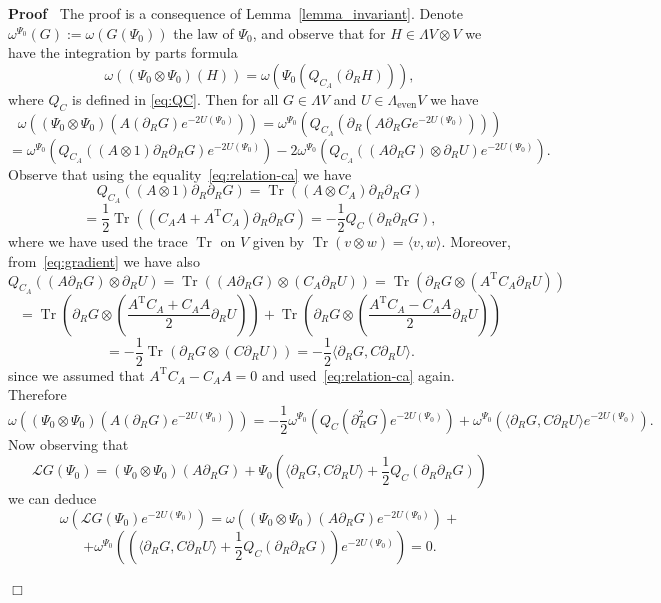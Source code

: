 \documentclass{article}
\newcommand{\Tau}{\mathrm{T}}
\newcommand{\assign}{:=}
\newcommand{\tmop}[1]{\ensuremath{\operatorname{#1}}}
\newenvironment{proof}{\noindent\textbf{Proof\ }}{\hspace*{\fill}$\Box$\medskip}
\begin{document}
\begin{proof}
  The proof is a consequence of Lemma~\ref{lemma_invariant}. Denote
  $\omega^{\Psi_0} (G) \assign \omega (G (\Psi_0))$ the law of $\Psi_0$, and
  observe that for $H \in \Lambda V \otimes V$ we have the integration by
  parts formula
  \[ \omega ((\Psi_0 \otimes \Psi_0) (H)) = \omega (\Psi_0 (Q_{C_A}
     (\partial_R H))), \]
  where $Q_C$ is defined in {\eqref{eq:QC}}. Then for all $G \in \Lambda V$
  and $U \in \Lambda_{\tmop{even}} V$ we have
  \[ \omega ((\Psi_0 \otimes \Psi_0) (A (\partial_R G) e^{- 2 U (\Psi_0)})) =
     \omega^{\Psi_0} (Q_{C_A} (\partial_R (A \partial_R G e^{- 2 U
     (\Psi_0)}))) \]
  \[ = \omega^{\Psi_0} (Q_{C_A} ((A \otimes 1) \partial_R \partial_R G) e^{- 2
     U (\Psi_0)}) - 2 \omega^{\Psi_0} (Q_{C_A} ((A \partial_R G) \otimes
     \partial_R U) e^{- 2 U (\Psi_0)}) . \]
  Observe that using the equality~{\eqref{eq:relation-ca}} we have
  \[ Q_{C_A} ((A \otimes 1) \partial_R \partial_R G) = \tmop{Tr} ((A \otimes
     C_A) \partial_R \partial_R G) \]
  \[ = \frac{1}{2} \tmop{Tr} ((C_A A + A^{\Tau} C_A) \partial_R \partial_R G)
     = - \frac{1}{2} Q_C (\partial_R \partial_R G), \]
  where we have used the trace $\tmop{Tr}$ on $V$ given by $\tmop{Tr} (v
  \otimes w) = \langle v, w \rangle$. Moreover, from~{\eqref{eq:gradient}} we
  have also
  \[ Q_{C_A} ((A \partial_R G) \otimes \partial_R U) = \tmop{Tr} ((A
     \partial_R G) \otimes (C_A \partial_R U)) = \tmop{Tr} (\partial_R G
     \otimes (A^{\Tau} C_A \partial_R U)) \]
  \[ = \tmop{Tr} \left( \partial_R G \otimes \left( \frac{A^{\Tau} C_A + C_A
     A}{2} \partial_R U \right) \right) + \tmop{Tr} \left( \partial_R G
     \otimes \left( \frac{A^{\Tau} C_A - C_A A}{2} \partial_R U \right)
     \right) \]
  \[ = - \frac{1}{2} \tmop{Tr} (\partial_R G \otimes (C \partial_R U)) = -
     \frac{1}{2} \langle \partial_R G, C \partial_R U \rangle . \]
  since we assumed that $A^{\Tau} C_A - C_A A = 0$ and
  used~{\eqref{eq:relation-ca}} again. Therefore
  \[ \omega ((\Psi_0 \otimes \Psi_0) (A (\partial_R G) e^{- 2 U (\Psi_0)})) =
     - \frac{1}{2} \omega^{\Psi_0} (Q_C (\partial_R^2 G) e^{- 2 U (\Psi_0)}) +
     \omega^{\Psi_0} (\langle \partial_R G, C \partial_R U \rangle e^{- 2 U
     (\Psi_0)}) . \]
  Now observing that
  \[ \mathcal{L}G (\Psi_0) = (\Psi_0 \otimes \Psi_0) (A \partial_R G) + \Psi_0
     \left( \langle \partial_R G, C \partial_R U \rangle + \frac{1}{2} Q_C
     (\partial_R \partial_R G) \right) \]
  we can deduce
  \[ \omega (\mathcal{L}G (\Psi_0) e^{- 2 U (\Psi_0)}) = \omega ((\Psi_0
     \otimes \Psi_0) (A \partial_R G) e^{- 2 U (\Psi_0)}) + \]
  \[ + \omega^{\Psi_0} \left( \left( \langle \partial_R G, C \partial_R U
     \rangle + \frac{1}{2} Q_C (\partial_R \partial_R G)  \right) e^{- 2 U
     (\Psi_0)} \right) = 0. \]
  
\end{proof}
\end{document}

